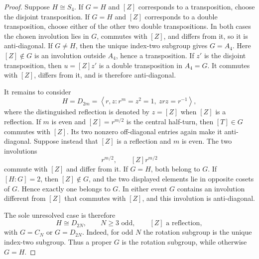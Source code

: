 \documentclass[11pt,letterpaper,onecolumn]{article}
\theoremstyle{plain}
\theoremstyle{definition}
\theoremstyle{remark}
\newcommand{\angles}[1]{\left\langle #1\right\rangle}
\begin{document}
\begin{proof}
		Suppose \(H\cong S_4\).  If \(G=H\) and \([Z]\) corresponds to a
		transposition, choose the disjoint transposition. If \(G=H\) and \([Z]\) corresponds
		to a double transposition, choose either of the other two double
		transpositions.  In both cases the chosen involution lies in \(G\), commutes
		with \([Z]\), and differs from it, so it is anti-diagonal.  If \(G\ne H\),
		then the unique index-two subgroup gives \(G=A_4\).  Here \([Z]\notin G\)
		is an involution outside \(A_4\), hence a transposition.  If \(z'\) is the
		disjoint transposition, then \(u=[Z]z'\) is a double transposition in
		\(A_4=G\). It commutes with \([Z]\), differs from it, and is therefore
		anti-diagonal.
		
		It remains to consider
		\[
		H=D_{2m}=\angles{r,z:r^m=z^2=1,\ zrz=r^{-1}},
		\]
		where the distinguished reflection is denoted by \(z=[Z]\) when \([Z]\)
		is a reflection.  If \(m\) is even and \([Z]=r^{m/2}\) is the central
		half-turn, then \([T]\in G\) commutes with \([Z]\). Its two nonzero
		off-diagonal entries again make it anti-diagonal.  Suppose instead that
		\([Z]\) is a reflection and \(m\) is even.  The two involutions
		\[
		r^{m/2},\qquad [Z]r^{m/2}
		\]
		commute with \([Z]\) and differ from it.  If \(G=H\), both belong to
		\(G\).  If \([H:G]=2\), then \([Z]\notin G\), and the two displayed
		elements lie in opposite cosets of \(G\). Hence exactly one belongs to
		\(G\).  In either event \(G\) contains an involution different from
		\([Z]\) that commutes with \([Z]\), and this involution is anti-diagonal.
		
		The sole unresolved case is therefore
		\[
		H\cong D_{2N},\qquad N\ge3\text{ odd},\qquad [Z]\text{ a reflection},
		\]
		with \(G=C_N\) or \(G=D_{2N}\).  Indeed, for odd \(N\) the rotation
		subgroup is the unique index-two subgroup. Thus a proper \(G\) is the
		rotation subgroup, while otherwise \(G=H\).
		

\end{proof}
\end{document}
